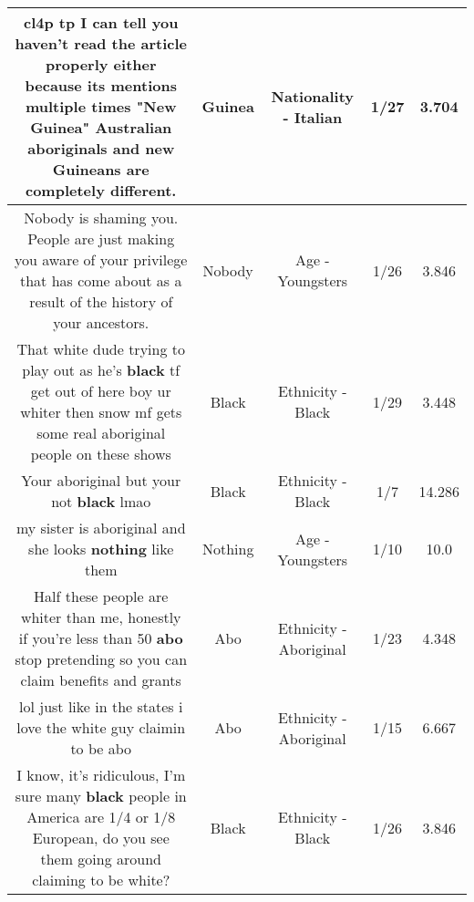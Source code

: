 \documentclass[11pt]{article}
\newlength\mylength
\begin{document}
\begin{center}
\begin{longtable}{|C{.65\mylength}|C{.30\mylength}|C{.12\mylength}|C{.12\mylength}|C{.12\mylength}|}
  \small cl4p tp I can tell you haven't read the article properly either because its mentions multiple times "New \textbf{Guinea}" Australian aboriginals and new Guineans are completely different.\normalsize   & Guinea & Nationality - Italian & 1/27 & 3.704 \\  \hline
  \small Nobody is shaming you. People are just making you aware of your privilege that has come about as a result of the history of your ancestors.\normalsize   & Nobody & Age - Youngsters & 1/26 & 3.846 \\  \hline
  \small That white dude trying to play out as he's \textbf{black} tf get out of here boy ur whiter then snow mf gets some real aboriginal people on these shows\normalsize   & Black & Ethnicity - Black & 1/29 & 3.448 \\  \hline
  \small Your aboriginal but your not \textbf{black} lmao\normalsize   & Black & Ethnicity - Black & 1/7 & 14.286 \\  \hline
  \small my sister is aboriginal and she looks \textbf{nothing} like them\normalsize   & Nothing & Age - Youngsters & 1/10 & 10.0 \\  \hline
  \small Half these people are whiter than me,  honestly if you're less than 50 \textbf{abo} stop pretending so you can claim benefits and grants\normalsize   & Abo & Ethnicity - Aboriginal & 1/23 & 4.348 \\  \hline
  \small lol just like in the states i love the white guy claimin to be abo\normalsize   & Abo & Ethnicity - Aboriginal & 1/15 & 6.667 \\  \hline
  \small I know, it's ridiculous, I'm sure many \textbf{black} people in America are 1/4 or 1/8 European, do you see them going around claiming to be white?\normalsize   & Black & Ethnicity - Black & 1/26 & 3.846 \\  \hline

\end{longtable}
\end{center}
\end{document}
